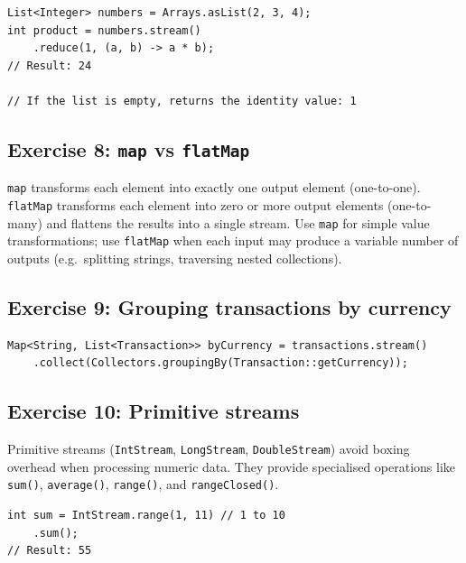 \documentclass[twoside=false,DIV=14]{scrartcl}
\begin{document}
\begin{lstlisting}
List<Integer> numbers = Arrays.asList(2, 3, 4);
int product = numbers.stream()
    .reduce(1, (a, b) -> a * b);
// Result: 24

// If the list is empty, returns the identity value: 1
\end{lstlisting}

\subsection*{Exercise 8: \texttt{map} vs \texttt{flatMap}}

\texttt{map} transforms each element into exactly one output element (one-to-one).  \texttt{flatMap} transforms each element into zero or more output elements (one-to-many) and flattens the results into a single stream.  Use \texttt{map} for simple value transformations; use \texttt{flatMap} when each input may produce a variable number of outputs (e.g.\ splitting strings, traversing nested collections).

\subsection*{Exercise 9: Grouping transactions by currency}

\begin{lstlisting}
Map<String, List<Transaction>> byCurrency = transactions.stream()
    .collect(Collectors.groupingBy(Transaction::getCurrency));
\end{lstlisting}

\subsection*{Exercise 10: Primitive streams}

Primitive streams (\texttt{IntStream}, \texttt{LongStream}, \texttt{DoubleStream}) avoid boxing overhead when processing numeric data.  They provide specialised operations like \texttt{sum()}, \texttt{average()}, \texttt{range()}, and \texttt{rangeClosed()}.

\begin{lstlisting}
int sum = IntStream.range(1, 11) // 1 to 10
    .sum();
// Result: 55
\end{lstlisting}
\end{document}

